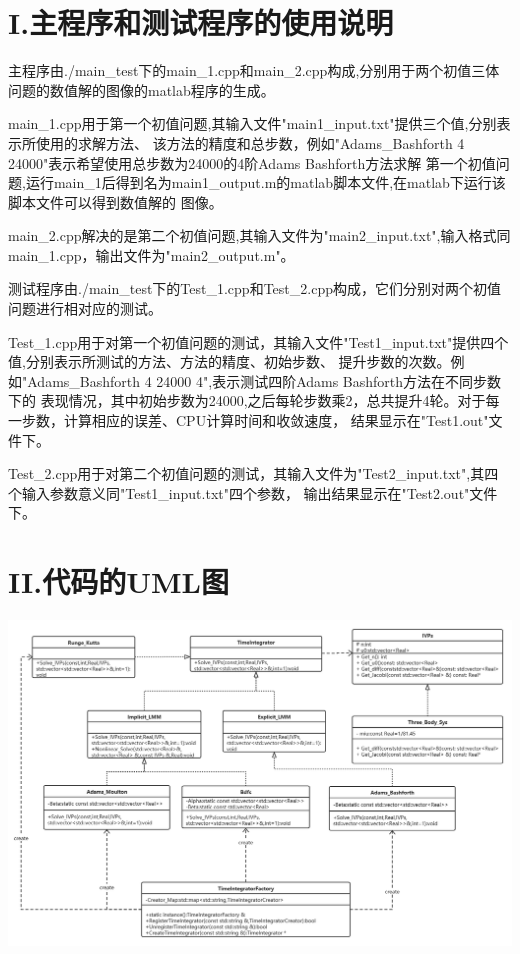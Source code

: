 \documentclass[twoside,a4paper]{article}
\begin{document}
\pagestyle{fancy}
\fancyhead{}



\section*{I.主程序和测试程序的使用说明}
\hspace{0.8em}
主程序由./main\_test下的main\_1.cpp和main\_2.cpp构成,分别用于两个初值三体问题的数值解的图像的matlab程序的生成。

main\_1.cpp用于第一个初值问题,其输入文件"main1\_input.txt"提供三个值,分别表示所使用的求解方法、
该方法的精度和总步数，例如"Adams\_Bashforth 4 24000"表示希望使用总步数为24000的4阶Adams Bashforth方法求解
第一个初值问题,运行main\_1后得到名为main1\_output.m的matlab脚本文件,在matlab下运行该脚本文件可以得到数值解的
图像。

main\_2.cpp解决的是第二个初值问题,其输入文件为"main2\_input.txt",输入格式同main\_1.cpp，输出文件为"main2\_output.m"。

测试程序由./main\_test下的Test\_1.cpp和Test\_2.cpp构成，它们分别对两个初值问题进行相对应的测试。

Test\_1.cpp用于对第一个初值问题的测试，其输入文件"Test1\_input.txt"提供四个值,分别表示所测试的方法、方法的精度、初始步数、
提升步数的次数。例如"Adams\_Bashforth 4 24000 4",表示测试四阶Adams Bashforth方法在不同步数下的
表现情况，其中初始步数为24000,之后每轮步数乘2，总共提升4轮。对于每一步数，计算相应的误差、CPU计算时间和收敛速度，
结果显示在"Test1.out"文件下。

Test\_2.cpp用于对第二个初值问题的测试，其输入文件为"Test2\_input.txt",其四个输入参数意义同"Test1\_input.txt"四个参数，
输出结果显示在"Test2.out"文件下。

\section*{II.代码的UML图}
\includegraphics[scale=0.37]{../png/uml.png}
\end{document}
